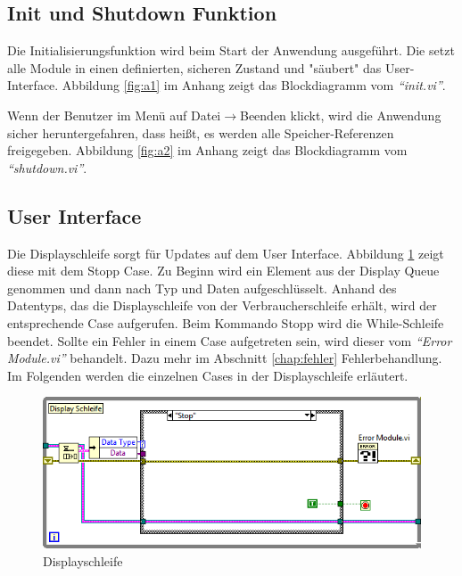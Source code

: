 		
		

\subsection{Init und Shutdown Funktion}	%
Die Initialisierungsfunktion wird beim Start der Anwendung ausgeführt. Die setzt alle Module in einen definierten, sicheren Zustand und "säubert" das User-Interface. 
Abbildung \ref{fig:a1} im Anhang zeigt das Blockdiagramm vom \textit{"`init.vi"'}.

Wenn der Benutzer im Menü auf Datei$\rightarrow$Beenden klickt, wird die Anwendung sicher heruntergefahren, dass heißt, es werden alle Speicher-Referenzen freigegeben. 
Abbildung \ref{fig:a2} im Anhang zeigt das Blockdiagramm vom \textit{"`shutdown.vi"'}.

\subsection{User Interface}
Die Displayschleife sorgt für Updates auf dem User Interface.  Abbildung \ref{fig:disp} zeigt diese mit dem Stopp Case. Zu Beginn wird ein Element aus der Display Queue genommen
und dann nach Typ und Daten aufgeschlüsselt. 
Anhand des Datentyps, das  die Displayschleife von der Verbraucherschleife erhält, wird der entsprechende Case aufgerufen. Beim Kommando Stopp wird die While-Schleife beendet. 
Sollte ein Fehler in einem Case aufgetreten sein, wird dieser vom \textit{"`Error Module.vi"'} behandelt. Dazu mehr im Abschnitt \ref{chap:fehler} Fehlerbehandlung. 
Im Folgenden werden die einzelnen Cases in der Displayschleife erläutert.

	\begin{figure}[h!]
	\centering
		\includegraphics[width=\textwidth]{Pics/front-stop.png}
	\caption{Displayschleife}
	\label{fig:disp}
	\end{figure}

